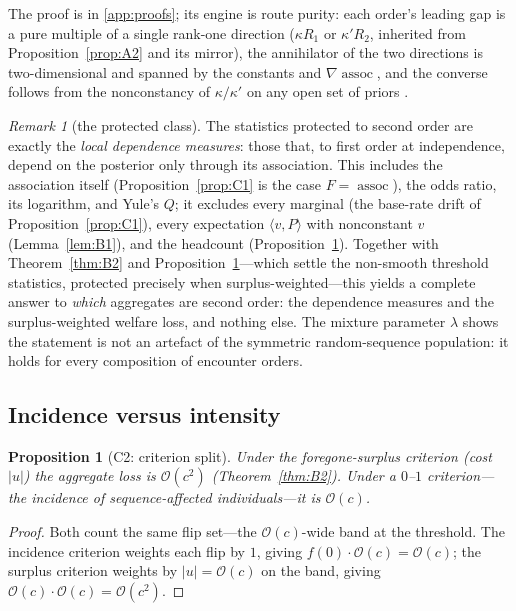 \documentclass[review,12pt,authoryear]{elsarticle}
\newtheorem{proposition}{Proposition}
\theoremstyle{remark}
\newtheorem{remark}{Remark}
\theoremstyle{definition}
\newcommand{\assoc}{\operatorname{assoc}}
\newcommand{\bigO}{\mathcal{O}}
\newcommand{\anchor}[1]{}
\begin{document}
The proof is in \ref{app:proofs}; its engine is route purity: each order's leading gap is a pure
multiple of a single rank-one direction ($\kappa R_1$ or $\kappa' R_2$, inherited from
Proposition~\ref{prop:A2} and its mirror), the annihilator of the two directions is
two-dimensional and spanned by the constants and $\nabla\assoc$, and the converse follows from
the nonconstancy of $\kappa/\kappa'$ on any open set of priors \anchor{Prop.~C3}.

\begin{remark}[the protected class]\label{rem:protected}
The statistics protected to second order are exactly the \emph{local dependence measures}:
those that, to first order at independence, depend on the posterior only through its
association. This includes the association itself (Proposition~\ref{prop:C1} is the case
$F=\assoc$), the odds ratio, its logarithm, and Yule's $Q$; it excludes every marginal (the
base-rate drift of Proposition~\ref{prop:C1}), every expectation $\langle v,P\rangle$ with
nonconstant $v$ (Lemma~\ref{lem:B1}), and the headcount (Proposition~\ref{prop:C2}). Together
with Theorem~\ref{thm:B2} and Proposition~\ref{prop:C2}---which settle the non-smooth threshold
statistics, protected precisely when surplus-weighted---this yields a complete answer to
\emph{which} aggregates are second order: the dependence measures and the surplus-weighted
welfare loss, and nothing else. The mixture parameter $\lambda$ shows the statement is not an
artefact of the symmetric random-sequence population: it holds for every composition of
encounter orders. \anchor{Prop.~C3}
\end{remark}


\subsection{Incidence versus intensity}
\label{sec:criterion}

\begin{proposition}[C2: criterion split]\label{prop:C2}
Under the foregone-surplus criterion (cost $|u|$) the aggregate loss is $\bigO(c^{2})$
(Theorem~\ref{thm:B2}). Under a $0$--$1$ criterion---the \emph{incidence} of sequence-affected
individuals---it is $\bigO(c)$. \anchor{Prop.~C2}
\end{proposition}

\begin{proof}
Both count the same flip set---the $\bigO(c)$-wide band at the threshold. The incidence
criterion weights each flip by $1$, giving $f(0)\cdot\bigO(c)=\bigO(c)$; the surplus criterion
weights by $|u|=\bigO(c)$ on the band, giving $\bigO(c)\cdot\bigO(c)=\bigO(c^{2})$.
\end{proof}
\end{document}
